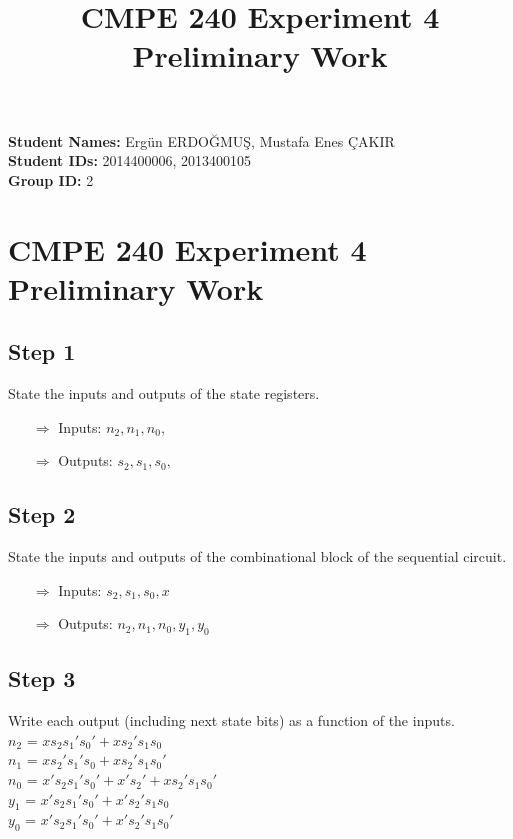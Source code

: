 \documentclass[12pt,a4paper]{report}
\title{CMPE 240 Experiment 4 Preliminary Work}
\begin{document}
\noindent
\textbf{Student Names:} Ergün ERDOĞMUŞ, Mustafa Enes ÇAKIR \\
\textbf{Student IDs:} 2014400006, 2013400105 \\
\textbf{Group ID:} 2

\section*{CMPE 240 Experiment 4 Preliminary Work}

\subsection*{Step 1}

State the inputs and outputs of the state registers.

\begin{itemize}
	\item[$\Rightarrow$] Inputs: $n_2, n_1, n_0, $
	\item[$\Rightarrow$] Outputs: $s_2, s_1, s_0, $
\end{itemize}

\subsection*{Step 2}

State the inputs and outputs of the combinational block of the sequential circuit.

\begin{itemize}
	\item[$\Rightarrow$] Inputs: $s_2, s_1, s_0, x $
	\item[$\Rightarrow$] Outputs: $n_2, n_1, n_0, y_1, y_0$
\end{itemize}

\subsection*{Step 3}

Write each output (including next state bits) as a function of the inputs.
\\
$n_2$ = $x s_2 s_1's_0' + x s_2' s_1 s_0$\\
$n_1$ = $x s_2's_1' s_0 + x s_2' s_1 s_0'$ \\
$n_0$ = $x' s_2 s_1' s_0' + x' s_2' + x s_2' s_1 s_0'$\\
$y_1$ = $x' s_2 s_1' s_0' + x' s_2' s_1 s_0$\\
$y_0$ = $x' s_2 s_1' s_0' + x' s_2' s_1 s_0'$\\
\end{document}
